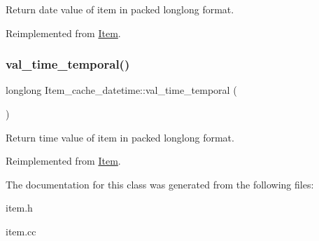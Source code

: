 Return date value of item in packed longlong format. 

Reimplemented from \mbox{\hyperlink{classItem_a9174217a46706eb2db74689b5365c4a5}{Item}}.

\mbox{\label{classItem__cache__datetime_a3a3dc978f89d305b26a866eebf2705a6}} 
\subsubsection{\texorpdfstring{val\+\_\+time\+\_\+temporal()}{val\_time\_temporal()}}
{\footnotesize\ttfamily longlong Item\+\_\+cache\+\_\+datetime\+::val\+\_\+time\+\_\+temporal (\begin{DoxyParamCaption}{ }\end{DoxyParamCaption})\hspace{0.3cm}{\ttfamily [virtual]}}

Return time value of item in packed longlong format. 

Reimplemented from \mbox{\hyperlink{classItem_a69ef60a3917a1bb4832498a695754c58}{Item}}.



The documentation for this class was generated from the following files\+:\begin{DoxyCompactItemize}
\item 
item.\+h\item 
item.\+cc\end{DoxyCompactItemize}
